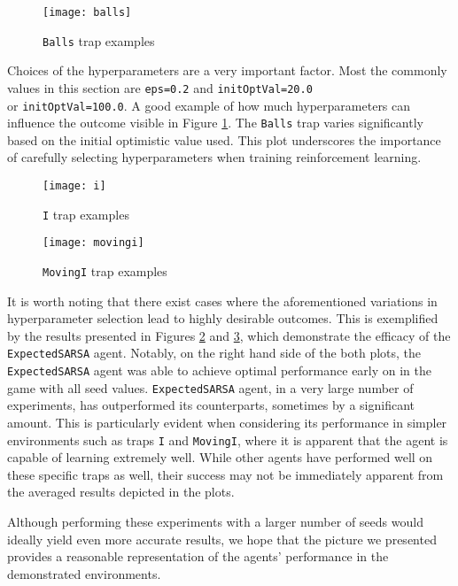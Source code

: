 \begin{figure}[h]
    \centering
    \texttt{[image: balls]}
    \caption{\texttt{Balls} trap examples}
    \label{fig:balls_eg}
\end{figure}

Choices of the hyperparameters are a very important factor. Most the commonly values in this section are \texttt{eps=0.2} and \texttt{initOptVal=20.0}\\ or \texttt{initOptVal=100.0}. A good example of how much hyperparameters can influence the outcome visible in Figure \ref{fig:balls_eg}. The \texttt{Balls} trap varies significantly based on the initial optimistic value used. This plot underscores the importance of carefully selecting hyperparameters when training reinforcement learning.

\begin{figure}[h]
    \centering
    \texttt{[image: i]}
    \caption{\texttt{I} trap examples}
    \label{fig:i_eg}
\end{figure}

\begin{figure}[h]
    \centering
    \texttt{[image: movingi]}
    \caption{\texttt{MovingI} trap examples}
    \label{fig:movingi_eg}
\end{figure}

It is worth noting that there exist cases where the aforementioned variations in hyperparameter selection lead to highly desirable outcomes. This is exemplified by the results presented in Figures \ref{fig:i_eg} and \ref{fig:movingi_eg}, which demonstrate the efficacy of the \texttt{ExpectedSARSA} agent. Notably, on the right hand side of the both plots, the \texttt{ExpectedSARSA} agent was able to achieve optimal performance early on in the game with all seed values. \texttt{ExpectedSARSA} agent, in a very large number of experiments, has outperformed its counterparts, sometimes by a significant amount. This is particularly evident when considering its performance in simpler environments such as traps \texttt{I} and \texttt{MovingI}, where it is apparent that the agent is capable of learning extremely well. While other agents have performed well on these specific traps as well, their success may not be immediately apparent from the averaged results depicted in the plots.

Although performing these experiments with a larger number of seeds would ideally yield even more accurate results, we hope that the picture we presented provides a reasonable representation of the agents' performance in the demonstrated environments.

